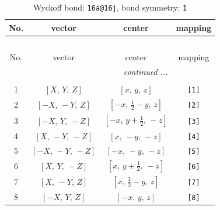 \documentclass[fleqn,8pt]{jsarticle}
\begin{document}
\begin{longtable}{cccc}
\caption{Wyckoff bond: {\tt 16a@16j}, bond symmetry: {\tt 1}}
 \\
 \hline \hline
No. & vector & center & mapping \\ \hline \endfirsthead

\multicolumn{3}{l}{\tablename\ \thetable{}} \\
 \hline \hline
No. & vector & center & mapping \\ \hline \endhead

 \hline \hline
\multicolumn{3}{r}{\footnotesize\it continued ...} \\ \endfoot

 \hline \hline
\multicolumn{3}{r}{} \\ \endlastfoot

1 & $\left[ X,\, Y,\, Z \right]$ & $\left[ x,\, y,\, z \right]$ & {\tt [1]} \\ \hline
2 & $\left[ - X,\, - Y,\, Z \right]$ & $\left[ - x,\, \frac{1}{2} - y,\, z \right]$ & {\tt [2]} \\ \hline
3 & $\left[ - X,\, Y,\, - Z \right]$ & $\left[ - x,\, y + \frac{1}{2},\, - z \right]$ & {\tt [3]} \\ \hline
4 & $\left[ X,\, - Y,\, - Z \right]$ & $\left[ x,\, - y,\, - z \right]$ & {\tt [4]} \\ \hline
5 & $\left[ - X,\, - Y,\, - Z \right]$ & $\left[ - x,\, - y,\, - z \right]$ & {\tt [5]} \\ \hline
6 & $\left[ X,\, Y,\, - Z \right]$ & $\left[ x,\, y + \frac{1}{2},\, - z \right]$ & {\tt [6]} \\ \hline
7 & $\left[ X,\, - Y,\, Z \right]$ & $\left[ x,\, \frac{1}{2} - y,\, z \right]$ & {\tt [7]} \\ \hline
8 & $\left[ - X,\, Y,\, Z \right]$ & $\left[ - x,\, y,\, z \right]$ & {\tt [8]} \\
\end{longtable}
\end{document}
